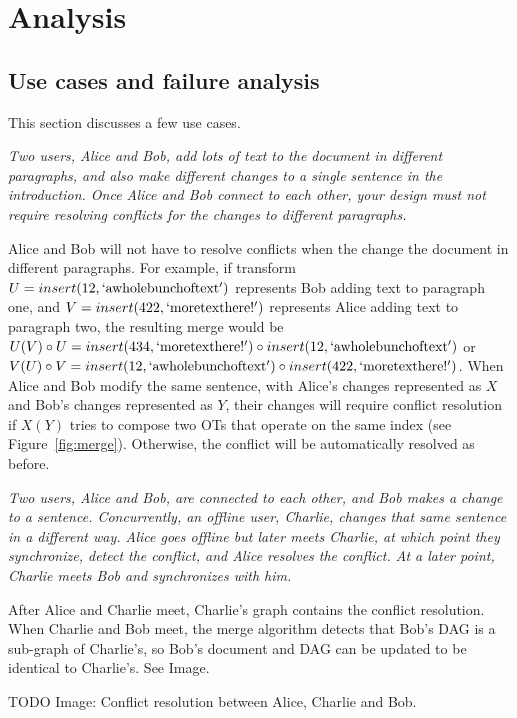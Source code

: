 \documentclass[11pt,titlepage]{article}
\begin{document}
\section{Analysis}

\subsection{Use cases and failure analysis}

This section discusses a few use cases.

\emph{Two users, Alice and Bob, add lots of text to the document in
  different paragraphs, and also make different changes to a single
  sentence in the introduction. Once Alice and Bob connect to each
  other, your design must not require resolving conflicts for the
  changes to different paragraphs.}

Alice and Bob will not have to resolve conflicts when the change the
document in different paragraphs. For example, if transform $U =
insert(12, \mathrm{`a whole bunch of text'})$ represents Bob adding
text to paragraph one, and $V = insert(422, \mathrm{`more text
  here!'})$ represents Alice adding text to paragraph two, the
resulting merge would be $U(V)\circ U = insert(434, \mathrm{`more text
  here!'})\circ insert(12, \mathrm{`a whole bunch of text'})$ or
$V(U)\circ V = insert(12, \mathrm{`a whole bunch of text'})\circ
insert(422, \mathrm{`more text here!'})$.  When Alice and Bob modify
the same sentence, with Alice's changes represented as $X$ and Bob's
changes represented as $Y$, their changes will require conflict
resolution if $X(Y)$ tries to compose two OTs that operate on the same
index (see Figure~\ref{fig:merge}). Otherwise, the conflict will be
automatically resolved as before.

\emph{Two users, Alice and Bob, are connected to each other, and Bob
  makes a change to a sentence. Concurrently, an offline user,
  Charlie, changes that same sentence in a different way. Alice goes
  offline but later meets Charlie, at which point they synchronize,
  detect the conflict, and Alice resolves the conflict. At a later
  point, Charlie meets Bob and synchronizes with him.}
  
After Alice and Charlie meet, Charlie's graph contains the conflict
resolution.  When Charlie and Bob meet, the merge algorithm detects
that Bob's DAG is a sub-graph of Charlie's, so Bob's document and DAG
can be updated to be identical to Charlie's.  See Image.

TODO Image: Conflict resolution between Alice, Charlie and Bob.
\end{document}
